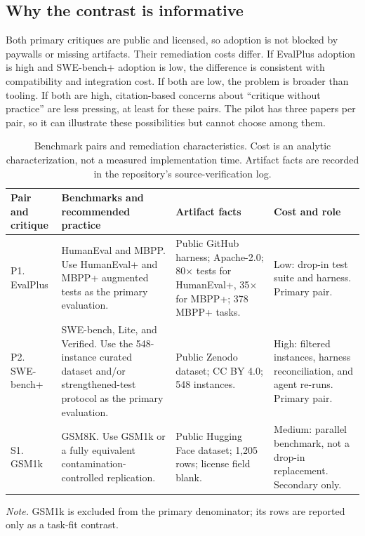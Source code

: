 \documentclass[11pt,a4paper]{article}
\begin{document}
\subsection{Why the contrast is informative}

Both primary critiques are public and licensed, so adoption is not blocked by paywalls or missing artifacts. Their remediation costs differ. If EvalPlus adoption is high and SWE-bench+ adoption is low, the difference is consistent with compatibility and integration cost. If both are low, the problem is broader than tooling. If both are high, citation-based concerns about ``critique without practice'' are less pressing, at least for these pairs. The pilot has three papers per pair, so it can illustrate these possibilities but cannot choose among them.

\begin{table}[t]
\centering
\caption{Benchmark pairs and remediation characteristics. Cost is an analytic characterization, not a measured implementation time. Artifact facts are recorded in the repository's source-verification log.}
\label{tab:pairs}
\footnotesize
\begin{threeparttable}
\begin{tabularx}{\textwidth}{@{}>{\raggedright\arraybackslash}p{2.45cm} >{\raggedright\arraybackslash}X >{\raggedright\arraybackslash}p{4.35cm} >{\raggedright\arraybackslash}p{3.55cm}@{}}
\toprule
Pair and critique & Benchmarks and recommended practice & Artifact facts & Cost and role \\
\midrule
P1. EvalPlus \citep{liu2023} & HumanEval and MBPP. Use HumanEval+ and MBPP+ augmented tests as the primary evaluation. & Public GitHub harness; Apache-2.0; 80$\times$ tests for HumanEval+, 35$\times$ for MBPP+; 378 MBPP+ tasks. & Low: drop-in test suite and harness. Primary pair. \\
\addlinespace
P2. SWE-bench+ \citep{aleithan2024} & SWE-bench, Lite, and Verified. Use the 548-instance curated dataset and/or strengthened-test protocol as the primary evaluation. & Public Zenodo dataset; CC BY 4.0; 548 instances. & High: filtered instances, harness reconciliation, and agent re-runs. Primary pair. \\
\addlinespace
S1. GSM1k \citep{zhang2024} & GSM8K. Use GSM1k or a fully equivalent contamination-controlled replication. & Public Hugging Face dataset; 1,205 rows; license field blank. & Medium: parallel benchmark, not a drop-in replacement. Secondary only. \\
\bottomrule
\end{tabularx}
\begin{tablenotes}[flushleft]\footnotesize
\item \textit{Note.} GSM1k is excluded from the primary denominator; its rows are reported only as a task-fit contrast.
\end{tablenotes}
\end{threeparttable}
\end{table}
\end{document}

